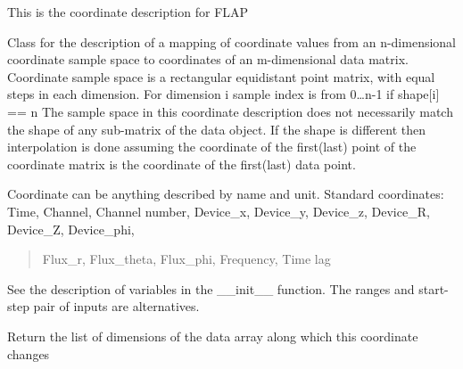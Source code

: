 \documentclass[letterpaper,10pt,english]{sphinxmanual}
\begin{document}
This is the coordinate description for FLAP

\begin{fulllineitems}
\label{\detokenize{coordinate:flap.coordinate.Coordinate}}
Class for the description of a mapping of coordinate values from an n-dimensional coordinate
sample space to coordinates of an m-dimensional data matrix.
Coordinate sample space is a rectangular equidistant point matrix, with equal steps in each dimension.
For dimension i sample index is from 0…n-1 if shape{[}i{]} == n
The sample space in this coordinate description does not necessarily match the shape of
any sub-matrix of the data object. If the shape is different then interpolation is done assuming
the coordinate of the first(last) point of the coordinate matrix is the coordinate of the first(last)
data point.

Coordinate can be anything described by name and unit.
Standard coordinates: Time, Channel, Channel number, Device\_x, Device\_y, Device\_z, Device\_R, Device\_Z, Device\_phi,
\begin{quote}

Flux\_r, Flux\_theta, Flux\_phi, Frequency, Time lag
\end{quote}

See the description of variables in the \_\_init\_\_ function.
The ranges and start-step pair of inputs are alternatives.

\begin{fulllineitems}
\label{\detokenize{coordinate:flap.coordinate.Coordinate.change_dimensions}}
Return the list of dimensions of the data array along which this coordinate
changes

\end{fulllineitems}


\end{fulllineitems}
\end{document}
